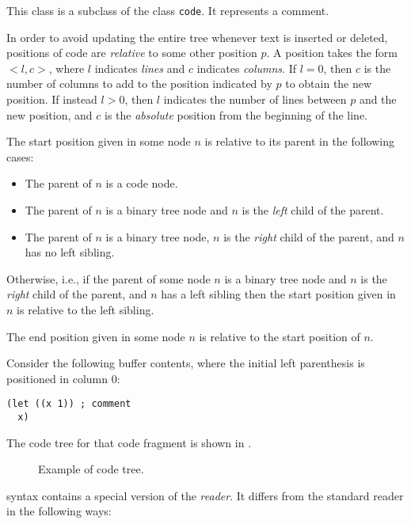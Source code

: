 
This class is a subclass of the class \texttt{code}.  It represents a
\commonlisp{} comment.

In order to avoid updating the entire tree whenever text is inserted
or deleted, positions of code are \emph{relative} to some other
position $p$.  A position takes the form $<l,c>$, where $l$ indicates
\emph{lines} and $c$ indicates \emph{columns}.  If $l = 0$, then $c$
is the number of columns to add to the position indicated by $p$ to
obtain the new position.  If instead $l > 0$, then $l$ indicates the
number of lines between $p$ and the new position, and $c$ is the
\emph{absolute} position from the beginning of the line.

The start position given in some node $n$ is relative to its parent in
the following cases:

\begin{itemize}
\item The parent of $n$ is a code node.
\item The parent of $n$ is a binary tree node and $n$ is the
  \emph{left} child of the parent.
\item The parent of $n$ is a binary tree node, $n$ is the
  \emph{right} child of the parent, and $n$ has no left sibling.
\end{itemize}

Otherwise, i.e., if the parent of some node $n$ is a binary tree node
and $n$ is the \emph{right} child of the parent, and $n$ has a left
sibling then the start position given in $n$ is relative to the left
sibling.

The end position given in some node $n$ is relative to the start
position of $n$.

Consider the following buffer contents, where the initial left
parenthesis is positioned in column $0$:

\begin{verbatim}
(let ((x 1)) ; comment
  x)
\end{verbatim}

The code tree for that code fragment is shown in .

\begin{figure}
\begin{center}
\end{center}
\caption{\label{fig-code-tree}
Example of code tree.}
\end{figure}

\commonlisp{} syntax contains a special version of the \commonlisp{}
\emph{reader}.  It differs from the standard reader in the following
ways:

